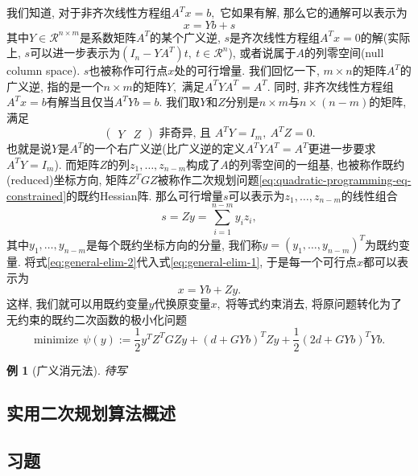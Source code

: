 \documentclass{SBCbookchapter}
\newtheorem{eg}[thm]{例}
\newcommand{\R}{\mathcal{R}}
\begin{document}
我们知道, 对于非齐次线性方程组$A^Tx = b,$ 它如果有解, 那么它的通解可以表示为
\begin{equation}
\label{eq:general-elim-1}
x = Y b + s
\end{equation}
其中$Y \in \R^{n\times m}$是系数矩阵$A^T$的某个广义逆, $s$是齐次线性方程组$A^T x = 0$的解(实际上, $s$可以进一步表示为$\left( I_n - Y A^T \right) t, ~ t \in \R^{n}$), 或者说属于$A$的列零空间(null column space). $s$也被称作可行点$x$处的可行增量. 我们回忆一下, $m\times n$的矩阵$A^T$的广义逆, 指的是一个$n\times m$的矩阵$Y,$ 满足$A^T Y A^T = A^T.$ 同时, 非齐次线性方程组$A^Tx = b$有解当且仅当$A^T Y b = b.$ 我们取$Y$和$Z$分别是$n\times m$与$n \times (n-m)$的矩阵, 满足
$$
\begin{pmatrix} Y & Z\end{pmatrix} \text{ 非奇异, 且~} A^T Y = I_m, ~ A^T Z = 0.
$$
也就是说$Y$是$A^T$的一个右广义逆(比广义逆的定义$A^T Y A^T = A^T$更进一步要求$A^T Y = I_m$). 而矩阵$Z$的列$z_1, \ldots, z_{n-m}$构成了$A$的列零空间的一组基, 也被称作既约(reduced)坐标方向, 矩阵$Z^T G Z$被称作二次规划问题\eqref{eq:quadratic-programming-eq-constrained}的既约Hessian阵. 那么可行增量$s$可以表示为$z_1, \ldots, z_{n-m}$的线性组合
\begin{equation}
\label{eq:general-elim-2}
s = Z y = \sum\limits_{i=1}^{n-m} y_i z_i,
\end{equation}
其中$y_1, \ldots, y_{n−m}$是每个既约坐标方向的分量, 我们称$y = (y_1, \ldots, y_{n−m})^T$为既约变量. 将式\eqref{eq:general-elim-2}代入式\eqref{eq:general-elim-1}, 于是每一个可行点$x$都可以表示为
\begin{equation}
\label{eq:general-elim-3}
x = Y b + Z y.
\end{equation}
这样, 我们就可以用既约变量$y$代换原变量$x,$ 将等式约束消去, 将原问题转化为了无约束的既约二次函数的极小化问题
\begin{equation}
\label{eq:general-elim-4}
\text{minimize} ~~ \psi(y) := \frac{1}{2} y^T Z^T G Z y + \left( d + GYb \right)^T Z y + \frac{1}{2} \left( 2d + G Y b \right)^T Y b.
\end{equation}

\begin{eg}[广义消元法]
\label{eg:7.2.2}
待写
\end{eg}


\subsection{实用二次规划算法概述}
\label{subsec:7.2.2}

\subsection*{习题}



\end{document}
